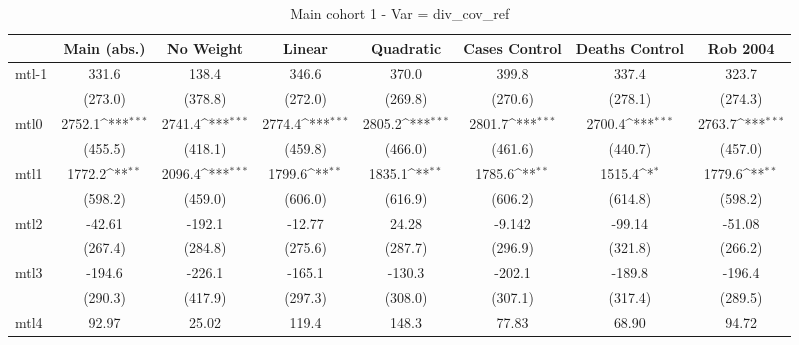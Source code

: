 \documentclass{article}
\begin{document}
{
\def\sym#1{\ifmmode^{#1}\else\(^{#1}\)\fi}
\begin{longtable}{l*{7}{c}}
\caption{Main cohort 1 - Var = div\_cov\_ref}\\
\hline\hline\endfirsthead\hline\endhead\hline\endfoot\endlastfoot
                &\multicolumn{1}{c}{Main (abs.)}&\multicolumn{1}{c}{No Weight}&\multicolumn{1}{c}{Linear}&\multicolumn{1}{c}{Quadratic}&\multicolumn{1}{c}{Cases Control}&\multicolumn{1}{c}{Deaths Control}&\multicolumn{1}{c}{Rob 2004}\\
\hline
mtl-1           &    331.6         &    138.4         &    346.6         &    370.0         &    399.8         &    337.4         &    323.7         \\
                &  (273.0)         &  (378.8)         &  (272.0)         &  (269.8)         &  (270.6)         &  (278.1)         &  (274.3)         \\
mtl0            &   2752.1\sym{***}&   2741.4\sym{***}&   2774.4\sym{***}&   2805.2\sym{***}&   2801.7\sym{***}&   2700.4\sym{***}&   2763.7\sym{***}\\
                &  (455.5)         &  (418.1)         &  (459.8)         &  (466.0)         &  (461.6)         &  (440.7)         &  (457.0)         \\
mtl1            &   1772.2\sym{**} &   2096.4\sym{***}&   1799.6\sym{**} &   1835.1\sym{**} &   1785.6\sym{**} &   1515.4\sym{*}  &   1779.6\sym{**} \\
                &  (598.2)         &  (459.0)         &  (606.0)         &  (616.9)         &  (606.2)         &  (614.8)         &  (598.2)         \\
mtl2            &   -42.61         &   -192.1         &   -12.77         &    24.28         &   -9.142         &   -99.14         &   -51.08         \\
                &  (267.4)         &  (284.8)         &  (275.6)         &  (287.7)         &  (296.9)         &  (321.8)         &  (266.2)         \\
mtl3            &   -194.6         &   -226.1         &   -165.1         &   -130.3         &   -202.1         &   -189.8         &   -196.4         \\
                &  (290.3)         &  (417.9)         &  (297.3)         &  (308.0)         &  (307.1)         &  (317.4)         &  (289.5)         \\
mtl4            &    92.97         &    25.02         &    119.4         &    148.3         &    77.83         &    68.90         &    94.72         \\

\end{longtable}}
\end{document}

